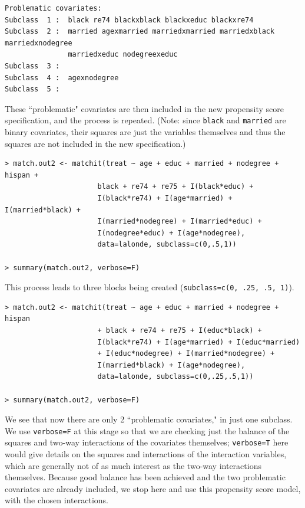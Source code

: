 \documentclass[oneside,letterpaper,titlepage]{article}
\begin{document}
\begin{verbatim}
Problematic covariates:
Subclass  1 :  black re74 blackxblack blackxeduc blackxre74
Subclass  2 :  married agexmarried marriedxmarried marriedxblack marriedxnodegree 
               marriedxeduc nodegreexeduc
Subclass  3 :  
Subclass  4 :  agexnodegree
Subclass  5 :  
\end{verbatim}

These ``problematic" covariates are then included in the new
propensity score specification, and the process is repeated.  (Note:
since {\tt black} and {\tt married} are binary covariates, their
squares are just the variables themselves and thus the squares are not
included in the new specification.)

\begin{verbatim}
> match.out2 <- matchit(treat ~ age + educ + married + nodegree + hispan +
                      black + re74 + re75 + I(black*educ) +
                      I(black*re74) + I(age*married) + I(married*black) + 
                      I(married*nodegree) + I(married*educ) +
                      I(nodegree*educ) + I(age*nodegree),
                      data=lalonde, subclass=c(0,.5,1))

> summary(match.out2, verbose=F)
\end{verbatim}

This process leads to three blocks being created  ({\tt subclass=c(0, .25, .5, 1)}).

\begin{verbatim}
> match.out2 <- matchit(treat ~ age + educ + married + nodegree + hispan
                      + black + re74 + re75 + I(educ*black) +
                      I(black*re74) + I(age*married) + I(educ*married)
                      + I(educ*nodegree) + I(married*nodegree) +
                      I(married*black) + I(age*nodegree),
                      data=lalonde, subclass=c(0,.25,.5,1))

> summary(match.out2, verbose=F)
\end{verbatim}

We see that now there are only 2 ``problematic covariates," in just
one subclass.  We use {\tt verbose=F} at this stage so that we are
checking just the balance of the squares and two-way interactions of
the covariates themselves; {\tt verbose=T} here would give details on
the squares and interactions of the interaction variables, which are
generally not of as much interest as the two-way interactions
themselves.  Because good balance has been achieved and the two
problematic covariates are already included, we stop here and use this
propensity score model, with the chosen interactions.
\end{document}

